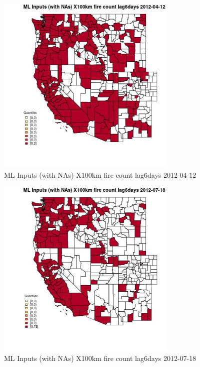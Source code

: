 \begin{figure} 
\centering  
\includegraphics[width=0.77\textwidth]{Code_Outputs/Report_ML_input_PM25_Step4_part_e_de_duplicated_aves_compiled_2019-05-14wNAs_CountyX100km_fire_count_lag6daysMean2012-04-12_2012-04-12.jpg} 
\caption{\label{fig:Report_ML_input_PM25_Step4_part_e_de_duplicated_aves_compiled_2019-05-14wNAsCountyX100km_fire_count_lag6daysMean2012-04-12_2012-04-12}ML Inputs (with NAs) X100km fire count lag6days 2012-04-12} 
\end{figure} 
 

\begin{figure} 
\centering  
\includegraphics[width=0.77\textwidth]{Code_Outputs/Report_ML_input_PM25_Step4_part_e_de_duplicated_aves_compiled_2019-05-14wNAs_CountyX100km_fire_count_lag6daysMean2012-07-18_2012-07-18.jpg} 
\caption{\label{fig:Report_ML_input_PM25_Step4_part_e_de_duplicated_aves_compiled_2019-05-14wNAsCountyX100km_fire_count_lag6daysMean2012-07-18_2012-07-18}ML Inputs (with NAs) X100km fire count lag6days 2012-07-18} 
\end{figure} 
 

